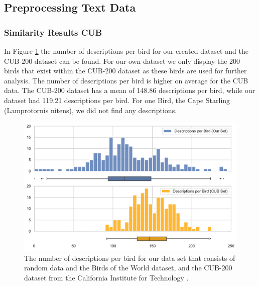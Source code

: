 \documentclass[a4paper, 12pt, oneside]{book} %
\begin{document}
\subsection{Preprocessing Text Data} \label{par:results_keywords}
\subsubsection{Similarity Results CUB}
In Figure \ref{fig:CUB_distribution} the number of descriptions per bird for our created dataset and the CUB-200 dataset can be found.
For our own dataset we only display the 200 birds that exist within the CUB-200 dataset as these birds are used for further analysis.
The number of descriptions per bird is higher on average for the CUB data.
The CUB-200 dataset has a mean of 148.86 descriptions per bird, while our dataset had 119.21 descriptions per bird.
For one Bird, the Cape Starling (Lamprotornis nitens), we did not find any descriptions.

\begin{figure}[h!]
 \centering
 \includegraphics[width=\textwidth]{figures/CUB_distribution.pdf}
 \caption[Bird description distribution]{The number of descriptions per bird for our data set that consists of random data and the Birds of the World dataset, and the CUB-200 dataset from the California Institute for Technology \autocite{welinder_caltech-ucsd_2010}. }
 \label{fig:CUB_distribution}
\end{figure}
\end{document}
